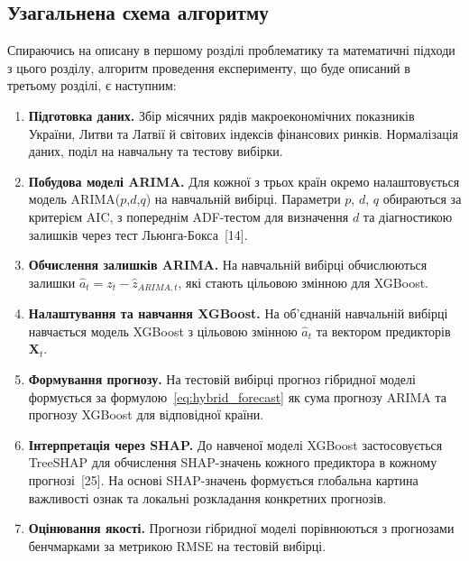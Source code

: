 \documentclass{bachelor_thesis}
\begin{document}
\subsection{Узагальнена схема алгоритму}

Спираючись на описану в першому розділі проблематику та математичні підходи з цього розділу, алгоритм проведення експерименту, що буде описаний в третьому розділі, є наступним:

\begin{enumerate}
    \item \textbf{Підготовка даних.} Збір місячних рядів макроекономічних показників України, Литви та Латвії й світових індексів фінансових ринків. Нормалізація даних, поділ на навчальну та тестову вибірки.

    \item \textbf{Побудова моделі ARIMA.} Для кожної з трьох країн окремо налаштовується модель ARIMA($p$,$d$,$q$) на навчальній вибірці. Параметри $p$, $d$, $q$ обираються за критерієм AIC, з попереднім ADF-тестом для визначення $d$ та діагностикою залишків через тест Льюнга-Бокса~[14].

    \item \textbf{Обчислення залишків ARIMA.} На навчальній вибірці обчислюються залишки $\hat{a}_t = z_t - \hat{z}_{ARIMA, t}$, які стають цільовою змінною для XGBoost.

    \item \textbf{Налаштування та навчання XGBoost.} На об'єднаній навчальній вибірці навчається модель XGBoost з цільовою змінною $\hat{a}_t$ та вектором предикторів $\mathbf{X}_t$.

    \item \textbf{Формування прогнозу.} На тестовій вибірці прогноз гібридної моделі формується за формулою~\eqref{eq:hybrid_forecast} як сума прогнозу ARIMA та прогнозу XGBoost для відповідної країни.

    \item \textbf{Інтерпретація через SHAP.} До навченої моделі XGBoost застосовується TreeSHAP для обчислення SHAP-значень кожного предиктора в кожному прогнозі~[25]. На основі SHAP-значень формується глобальна картина важливості ознак та локальні розкладання конкретних прогнозів.

    \item \textbf{Оцінювання якості.} Прогнози гібридної моделі порівнюються з прогнозами бенчмарками за метрикою RMSE на тестовій вибірці.
\end{enumerate}
\end{document}
